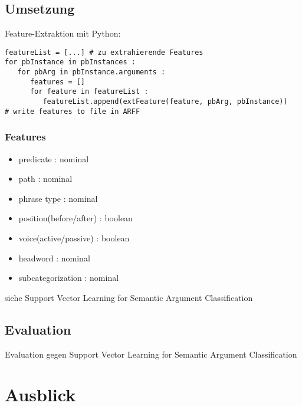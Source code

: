 \documentclass[runningheads]{llncs}
\begin{document}
\subsection{Umsetzung}
Feature-Extraktion mit Python:
\begin{lstlisting}[frame=lines]
featureList = [...] # zu extrahierende Features
for pbInstance in pbInstances :
   for pbArg in pbInstance.arguments :
      features = []
      for feature in featureList :
         featureList.append(extFeature(feature, pbArg, pbInstance))
# write features to file in ARFF
\end{lstlisting}

\subsubsection{Features}
\begin{itemize}
\item predicate : nominal
\item path : nominal
\item phrase type : nominal
\item position(before/after) : boolean
\item voice(active/passive) : boolean
\item headword : nominal
\item subcategorization : nominal
\end{itemize}
siehe Support Vector Learning for Semantic Argument Classiﬁcation

\subsection{Evaluation}
Evaluation gegen Support Vector Learning for Semantic Argument Classiﬁcation

\section{Ausblick}

	
\end{document}

